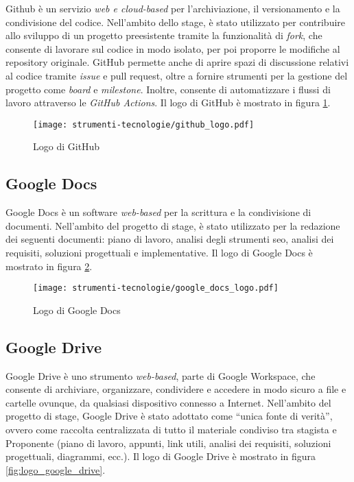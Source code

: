 \par Github è un servizio \textit{web e cloud-based} per l'archiviazione, il versionamento e la condivisione del codice. Nell’ambito dello stage, è stato utilizzato per contribuire allo sviluppo di un progetto preesistente tramite la funzionalità di \textit{fork}, che consente di lavorare sul codice in modo isolato, per poi proporre le modifiche al \gls{repository} originale. GitHub permette anche di aprire spazi di discussione relativi al codice tramite \textit{issue} e \gls{pull request}, oltre a fornire strumenti per la gestione del progetto come \textit{board} e \textit{milestone}. Inoltre, consente di automatizzare i flussi di lavoro attraverso le \textit{GitHub Actions}. Il logo di GitHub è mostrato in figura \ref{fig:logo_github}.

\begin{figure}[H]
  \centering 
  \texttt{[image: strumenti-tecnologie/github\_logo.pdf]} 
  \caption{Logo di GitHub}
  \label{fig:logo_github}
\end{figure}

\subsection*{Google Docs}

\par Google Docs è un software \textit{web-based} per la scrittura e la condivisione di documenti. Nell’ambito del progetto di stage, è stato utilizzato per la redazione dei seguenti documenti: piano di lavoro, analisi degli strumenti \gls{seo}, analisi dei \gls{requisiti}, soluzioni progettuali e implementative. Il logo di Google Docs è mostrato in figura \ref{fig:logo_google_docs}.

\begin{figure}[H]
  \centering 
  \texttt{[image: strumenti-tecnologie/google\_docs\_logo.pdf]} 
  \caption{Logo di Google Docs}
  \label{fig:logo_google_docs}
\end{figure}

\subsection*{Google Drive}

\par Google Drive è uno strumento \textit{web-based}, parte di Google Workspace, che consente di archiviare, organizzare, condividere e accedere in modo sicuro a file e cartelle ovunque, da qualsiasi dispositivo connesso a Internet. Nell’ambito del progetto di stage, Google Drive è stato adottato come “unica fonte di verità”, ovvero come raccolta centralizzata di tutto il materiale condiviso tra stagista e Proponente (piano di lavoro, appunti, link utili, analisi dei \gls{requisiti}, soluzioni progettuali, diagrammi, ecc.). Il logo di Google Drive è mostrato in figura \ref{fig:logo_google_drive}.

